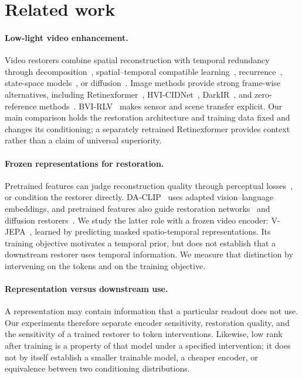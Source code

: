 \section{Related work}\label{sec:related}

\paragraph{Low-light video enhancement.}
Video restorers combine spatial reconstruction with temporal redundancy through
decomposition~\citep{stcd2025}, spatial--temporal compatible
learning~\citep{tcenet}, recurrence~\citep{retinexmcnet}, state-space
models~\citep{bvi_mamba}, or diffusion~\citep{bvi_rlv,dl_diff}.
Image methods provide strong frame-wise alternatives, including
Retinexformer~\citep{retinexformer}, HVI-CIDNet~\citep{hvi_cidnet},
DarkIR~\citep{darkir}, and zero-reference methods~\citep{zerodce2020,sci2022}.
BVI-RLV~\citep{bvi_rlv} makes sensor and scene transfer explicit.
Our main comparison holds the restoration architecture and training data fixed
and changes its conditioning; a separately retrained Retinexformer provides
context rather than a claim of universal superiority.

\paragraph{Frozen representations for restoration.}
Pretrained features can judge reconstruction quality through perceptual
losses~\citep{johnson_perceptual,lpips}, or condition the restorer directly.
DA-CLIP~\citep{daclip} uses adapted vision--language embeddings, and pretrained
features also guide restoration networks~\citep{xu2024priors} and diffusion
restorers~\citep{stablesr}. We study the latter role with a frozen video
encoder: V-JEPA~\citep{vjepa,vjepa2}, learned by predicting masked
spatio-temporal representations. Its training objective motivates a temporal
prior, but does not establish that a downstream restorer uses temporal
information. We measure that distinction by intervening on the tokens and on
the training objective.

\paragraph{Representation versus downstream use.}
A representation may contain information that a particular readout does not
use. Our experiments therefore separate encoder sensitivity, restoration
quality, and the sensitivity of a trained restorer to token interventions.
Likewise, low rank after training is a property of that model under a specified
intervention; it does not by itself establish a smaller trainable model, a
cheaper encoder, or equivalence between two conditioning distributions.
